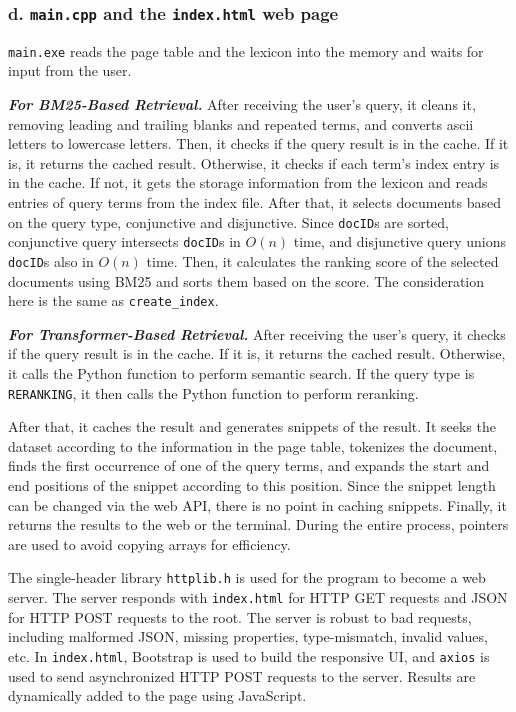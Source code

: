 \documentclass[11pt]{article}
\begin{document}
\hypertarget{d-maincpp-and-the-indexhtml-web-page}{%
\subsubsection{d. \texttt{main.cpp} and the
\texttt{index.html} web page}\label{d-maincpp-and-the-indexhtml-web-page}}

\texttt{main.exe} reads the page table and the lexicon into the memory
and waits for input from the user.

\emph{\textbf{For BM25-Based Retrieval.}} After receiving the user's
query, it cleans it, removing leading and trailing blanks and repeated
terms, and converts ascii letters to lowercase letters. Then, it checks
if the query result is in the cache. If it is, it returns the cached
result. Otherwise, it checks if each term's index entry is in the cache.
If not, it gets the storage information from the lexicon and reads
entries of query terms from the index file. After that, it selects
documents based on the query type, conjunctive and disjunctive. Since
\texttt{docID}s are sorted, conjunctive query intersects \texttt{docID}s
in \(O(n)\) time, and disjunctive query unions \texttt{docID}s also in
\(O(n)\) time. Then, it calculates the ranking score of the selected
documents using BM25 and sorts them based on the score. The
consideration here is the same as \texttt{create\_index}.

\emph{\textbf{For Transformer-Based Retrieval.}} After receiving the
user's query, it checks if the query result is in the cache. If it is,
it returns the cached result. Otherwise, it calls the Python function to
perform semantic search. If the query type is \texttt{RERANKING}, it
then calls the Python function to perform reranking.

After that, it caches the result and generates snippets of the result.
It seeks the dataset according to the information in the page table,
tokenizes the document, finds the first occurrence of one of the query
terms, and expands the start and end positions of the snippet according
to this position. Since the snippet length can be changed via the web
API, there is no point in caching snippets. Finally, it returns the
results to the web or the terminal. During the entire process, pointers
are used to avoid copying arrays for efficiency.

The single-header library \texttt{httplib.h} is used for the program to
become a web server. The server responds with \texttt{index.html} for
HTTP GET requests and JSON for HTTP POST requests to the root. The
server is robust to bad requests, including malformed JSON, missing
properties, type-mismatch, invalid values, etc. In \texttt{index.html},
Bootstrap is used to build the responsive UI, and \texttt{axios} is used
to send asynchronized HTTP POST requests to the server. Results are
dynamically added to the page using JavaScript.
\end{document}
